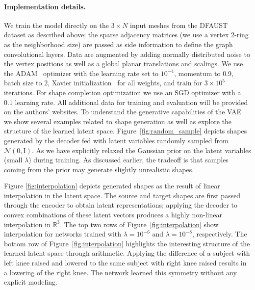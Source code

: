 \documentclass[10pt,twocolumn,letterpaper]{article}
\newcommand{\bb}[1]{\bm{\mathrm{#1}}}
\begin{document}
\paragraph{Implementation details.}
We train the model directly on the $3 \times N$ input meshes from the DFAUST dataset as described above; the sparse adjacency matrices (we use a vertex 2-ring as the neighborhood size) are passed as side information to define the graph convolutional layers. Data are augmented by adding normally distributed noise to the vertex positions as well as a global planar translations and scalings. We use the ADAM~\cite{kingma2014adam} optimizer with the learning rate set to $10^{-4}$, momentum to $0.9$, batch size to $2$, Xavier initialization~\cite{xavierInit} for all weights, and train for $3 \times 10^5$ iterations. For shape completion optimization we use an SGD optimizer with a $0.1$ learning rate. All additional data for training and evaluation will be provided on the authors' websites.
%
%
%
To understand the generative capabilities of the VAE we show several examples related to shape generation as well as explore the structure of the learned latent space.
Figure~\ref{fig:random_sample} depicts shapes generated by the decoder fed with latent variables randomly sampled from $\mathcal{N}(\bb{0},\bb{I})$. As we have explicitly relaxed the Gaussian prior on the latent variables (small $\lambda$) during training. As discussed earlier, the tradeoff is that samples coming from the prior may generate slightly unrealistic shapes.

Figure \ref{fig:interpolation} depicts generated shapes as the result of linear interpolation in the latent space. The source and target shapes are first passed through the encoder to obtain latent representations; applying the decoder to convex combinations of these latent vectors produces a highly non-linear interpolation in $\mathbb{R}^3$. The top two rows of Figure~\ref{fig:interpolation} show interpolation for networks trained with $\lambda=10^{-6}$ and $\lambda=10^{-8}$, respectively. The bottom row of Figure~\ref{fig:interpolation} highlights the interesting structure of the learned latent space through arithmetic. Applying the difference of a subject with left knee raised and lowered to the same subject with right knee raised results in a lowering of the right knee. The network learned this symmetry without any explicit modeling.
\end{document}
